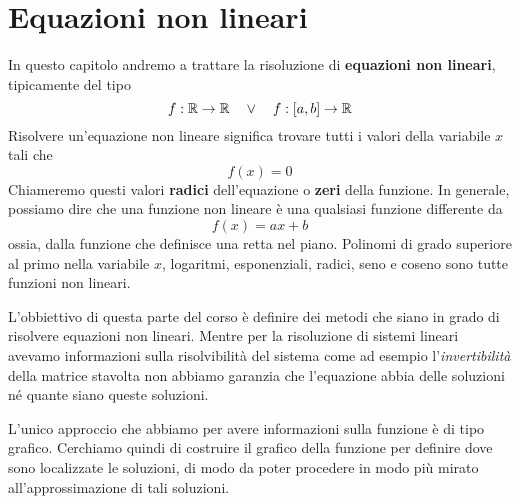 \chapter{Equazioni non lineari}
In questo capitolo andremo a trattare la risoluzione di \textbf{equazioni non lineari}, tipicamente del tipo
\[ f : \mathbb{R} \to \mathbb{R} \quad \vee \quad f : [a, b] \to \mathbb{R} \]
Risolvere un'equazione non lineare significa trovare tutti i valori della variabile $x$ tali che
\[ f(x) = 0 \]
Chiameremo questi valori \textbf{radici} dell'equazione o \textbf{zeri} della funzione. In generale, possiamo
dire che una funzione non lineare è una qualsiasi funzione differente da
\[ f(x) = a x + b \]
ossia, dalla funzione che definisce una retta nel piano. Polinomi di grado superiore al primo nella variabile
$x$, logaritmi, esponenziali, radici, seno e coseno sono tutte funzioni non lineari.

L'obbiettivo di questa parte del corso è definire dei metodi che siano in grado di risolvere equazioni non
lineari. Mentre per la risoluzione di sistemi lineari avevamo informazioni sulla risolvibilità del sistema
come ad esempio l'\emph{invertibilità} della matrice stavolta non abbiamo garanzia che l'equazione abbia
delle soluzioni né quante siano queste soluzioni.

L'unico approccio che abbiamo per avere informazioni sulla funzione è di tipo grafico. Cerchiamo quindi di
costruire il grafico della funzione per definire dove sono localizzate le soluzioni, di modo da poter procedere
in modo più mirato all'approssimazione di tali soluzioni.

